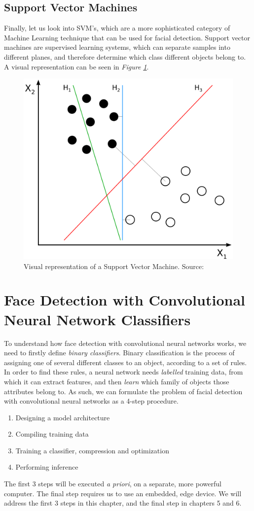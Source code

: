 \subsection{Support Vector Machines}
Finally, let us look into SVM's, which are a more sophisticated category of Machine Learning technique that can be used for facial detection. Support vector machines are supervised learning systems, which can separate samples into different planes, and therefore determine which class different objects belong to. A visual representation can be seen in \textit{Figure \ref{fig:svm}}. \cite{svm}
\begin{figure}
    \centering
    \includegraphics[width = 10 cm]{images/Svm_separating_hyperplanes_(SVG).svg.png}
    \caption{Visual representation of a Support Vector Machine. Source: \cite{svm_pic}}
    \label{fig:svm}
\end{figure}

\section{Face Detection with Convolutional Neural Network Classifiers}
To understand how face detection with convolutional neural networks works, we need to firstly define \textit{binary classifiers}. Binary classification is the process of assigning one of several different classes to an object, according to a set of rules. In order to find these rules, a neural network needs \textit{labelled} training data, from which it can extract features, and then \textit{learn} which family of objects those attributes belong to. As such, we can formulate the problem of facial detection with convolutional neural networks as a 4-step procedure.
\begin{enumerate}
    \item Designing a model architecture
    \item Compiling training data
    \item Training a classifier, compression and optimization
    \item Performing inference
\end{enumerate}
The first 3 steps will be executed \textit{a priori}, on a separate, more powerful computer. The final step requires us to use an embedded, edge device. We will address the first 3 steps in this chapter, and the final step in chapters 5 and 6. 


